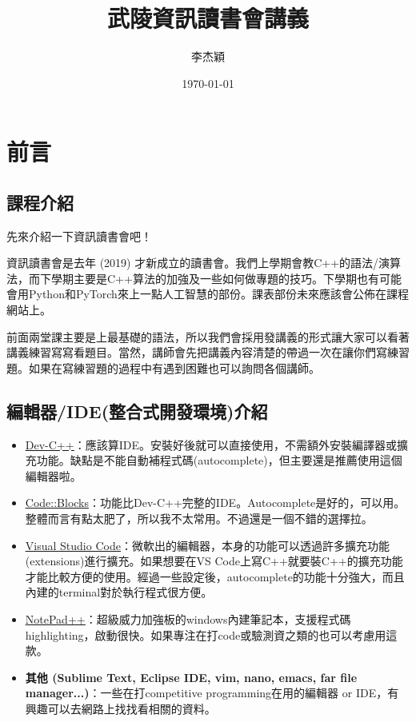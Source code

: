 \documentclass[a4paper, 11pt, oneside]{book}
\title{武陵資訊讀書會講義}
\author{李杰穎}
\date{\today} %
\begin{document}
\maketitle
\tableofcontents

\chapter{前言}
\section{課程介紹}
先來介紹一下資訊讀書會吧！

資訊讀書會是去年 (2019) 才新成立的讀書會。我們上學期會教C++的語法/演算法，而下學期主要是C++算法的加強及一些如何做專題的技巧。下學期也有可能會用Python和PyTorch來上一點人工智慧的部份。課表部份未來應該會公佈在課程網站上。

前面兩堂課主要是上最基礎的語法，所以我們會採用發講義的形式讓大家可以看著講義練習寫寫看題目。當然，講師會先把講義內容清楚的帶過一次在讓你們寫練習題。如果在寫練習題的過程中有遇到困難也可以詢問各個講師。

\section{編輯器/IDE(整合式開發環境)介紹}
\begin{itemize}
	\item \href{https://sourceforge.net/projects/orwelldevcpp/}{\underline{Dev-C++}}：應該算IDE。安裝好後就可以直接使用，不需額外安裝編譯器或擴充功能。缺點是不能自動補程式碼(autocomplete)，但主要還是推薦使用這個編輯器啦。
	\item \href{https://sourceforge.net/projects/codeblocks/files/Binaries/20.03/Windows/codeblocks-20.03-setup.exe/download}{\underline{Code::Blocks}}：功能比Dev-C++完整的IDE。Autocomplete是好的，可以用。整體而言有點太肥了，所以我不太常用。不過還是一個不錯的選擇拉。
	\item \href{https://code.visualstudio.com/}{\underline{Visual Studio Code}}：微軟出的編輯器，本身的功能可以透過許多擴充功能(extensions)進行擴充。如果想要在VS Code上寫C++就要裝C++的擴充功能才能比較方便的使用。經過一些設定後，autocomplete的功能十分強大，而且內建的terminal對於執行程式很方便。
	\item \href{https://notepad-plus-plus.org/}{\underline{NotePad++}}：超級威力加強板的windows內建筆記本，支援程式碼highlighting，啟動很快。如果專注在打code或驗測資之類的也可以考慮用這款。
	\item \textbf{其他 (Sublime Text, Eclipse IDE, vim, nano, emacs, far file manager...)}：一些在打competitive programming在用的編輯器 or IDE，有興趣可以去網路上找找看相關的資料。
\end{itemize}
\end{document}
